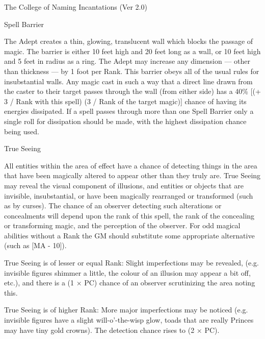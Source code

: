 \begin{Chapter}{The College of Naming Incantations (Ver 2.0)}
\begin{spell}[S-9]{Spell Barrier}
\begin{effects}
The Adept creates a thin, glowing, translucent wall which blocks the
passage of magic.  The barrier is either 10 feet high and 20 feet long
as a wall, or 10 feet high and 5 feet in radius as a ring.  The Adept
may increase any dimension --- other than thickness --- by 1 foot per
Rank. This barrier obeys all of the usual rules for insubstantial
walls.  Any magic cast in such a way that a direct line drawn from the
caster to their target passes through the wall (from either side) has
a 40\% [(+ 3 / Rank with this spell) (3 / Rank of the target magic)]
chance of having its energies dissipated.  If a spell passes through
more than one Spell Barrier only a single roll for dissipation should
be made, with the highest dissipation chance being used.
\end{effects}
\end{spell}

\begin{spell}[S-10]{True Seeing}

\begin{effects}
All entities within the area of effect have a chance of detecting
things in the area that have been magically altered to appear other
than they truly are.  True Seeing may reveal the visual component of
illusions, and entities or objects that are invisible, insubstantial,
or have been magically rearranged or transformed (such as by
curses). The chance of an observer detecting such alterations or
concealments will depend upon the rank of this spell, the rank of the
concealing or transforming magic, and the perception of the
observer. For odd magical abilities without a Rank the GM should
substitute some appropriate alternative (such as [MA - 10]).

True Seeing is of lesser or equal Rank: Slight imperfections may be
revealed, (e.g. invisible figures shimmer a little, the colour of an
illusion may appear a bit off, etc.), and there is a (1 × PC) chance
of an observer scrutinizing the area noting this.

True Seeing is of higher Rank: More major imperfections may be noticed
(e.g. invisible figures have a slight will-o’-the-wisp glow, toads
that are really Princes may have tiny gold crowns).  The detection
chance rises to (2 × PC).


\end{effects}
\end{spell}
\end{Chapter}
